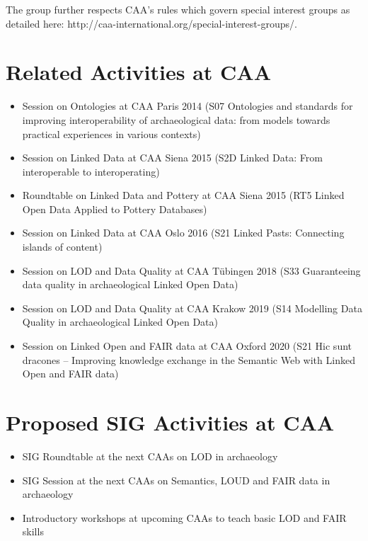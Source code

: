 \documentclass[a4paper]{article}
\begin{document}
The group further respects CAA's rules which govern special interest groups as detailed here: http://caa-international.org/special-interest-groups/.

\section{Related Activities at CAA}\label{related-activities-at-caa}

\begin{itemize}
\item
  Session on Ontologies at CAA Paris 2014 (S07 Ontologies and standards for improving interoperability of archaeological data: from models towards practical experiences in various contexts)
\item
  Session on Linked Data at CAA Siena 2015 (S2D Linked Data: From interoperable to interoperating)
\item
  Roundtable on Linked Data and Pottery at CAA Siena 2015 (RT5 Linked Open Data Applied to Pottery Databases)
\item
  Session on Linked Data at CAA Oslo 2016 (S21 Linked Pasts: Connecting islands of content)
\item
  Session on LOD and Data Quality at CAA Tübingen 2018 (S33 Guaranteeing data quality in archaeological Linked Open Data)
\item
  Session on LOD and Data Quality at CAA Krakow 2019 (S14 Modelling Data Quality in archaeological Linked Open Data)
\item
  Session on Linked Open and FAIR data at CAA Oxford 2020 (S21 Hic sunt dracones -- Improving knowledge exchange in the Semantic Web with Linked Open and FAIR data)
\end{itemize}

\section{Proposed SIG Activities at CAA}\label{proposed-sig-activities-at-caa}

\begin{itemize}
\item
  SIG Roundtable at the next CAAs on LOD in archaeology
\item
  SIG Session at the next CAAs on Semantics, LOUD and FAIR data in archaeology
\item
  Introductory workshops at upcoming CAAs to teach basic LOD and FAIR skills
\end{itemize}
\end{document}
